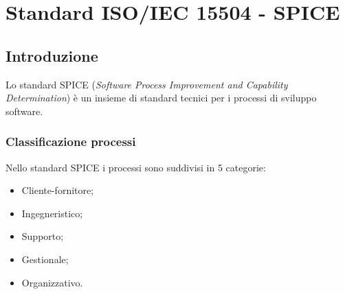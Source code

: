 \documentclass[a4paper]{article}
\begin{document}
\section{Standard ISO/IEC 15504 - SPICE}
\subsection{Introduzione}
Lo standard SPICE (\textit{Software Process Improvement and Capability Determination}) è un insieme di standard tecnici per i processi di sviluppo software.

\subsubsection{Classificazione processi}
Nello standard SPICE i processi sono suddivisi in 5 categorie:
\begin{itemize}
  \item Cliente-fornitore;
  \item Ingegneristico;
  \item Supporto;
  \item Gestionale;
  \item Organizzativo.
\end{itemize}
\end{document}
